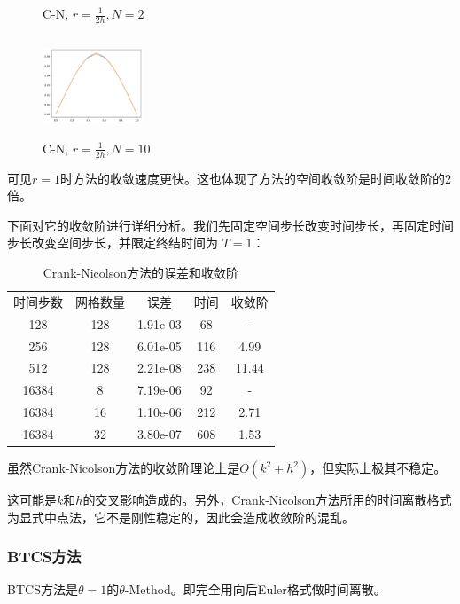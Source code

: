 \documentclass{ctexart}
\begin{document}
\begin{figure}[htbp]
\begin{minipage}{5cm}
		\caption{C-N, $r=\frac 1{2h},N=2$}
		\label{CN5}
	\end{minipage}
	\begin{minipage}{5cm}
		\centering
		\includegraphics[width = 3cm, height = 3cm]{1-2-3.png}
		\caption{C-N, $r=\frac 1{2h},N=10$}
		\label{CN6}
	\end{minipage}
\end{figure}

可见$r=1$时方法的收敛速度更快。这也体现了方法的空间收敛阶是时间收敛阶的2倍。

下面对它的收敛阶进行详细分析。我们先固定空间步长改变时间步长，再固定时间步长改变空间步长，并限定终结时间为 $T=1$：

\begin{table}\centering
	\begin{tabular}{|c|c|c|c|c|}
	\hline
	时间步数 & 网格数量 & 误差 & 时间 & 收敛阶\\ \cline{1-5}
	128 & 128 & 1.91e-03 & 68  & - \\ \cline{1-5}
	256 & 128 & 6.01e-05 & 116 & 4.99 \\ \cline{1-5}
	512 & 128 & 2.21e-08 & 238 & 11.44\\ \cline{1-5}
	16384 & 8 & 7.19e-06 & 92 & - \\ \cline{1-5}
	16384 & 16 & 1.10e-06 & 212 & 2.71 \\ \cline{1-5}
	16384 & 32 & 3.80e-07 & 608 & 1.53 \\ \cline{1-5}
	\end{tabular}
	\caption{Crank-Nicolson方法的误差和收敛阶}
\end{table}

虽然Crank-Nicolson方法的收敛阶理论上是$O(k^2+h^2)$，但实际上极其不稳定。

这可能是$k$和$h$的交叉影响造成的。另外，Crank-Nicolson方法所用的时间离散格式为显式中点法，它不是刚性稳定的，因此会造成收敛阶的混乱。

\subsubsection{BTCS方法}

BTCS方法是$\theta=1$的$\theta$-Method。即完全用向后Euler格式做时间离散。
\end{document}
